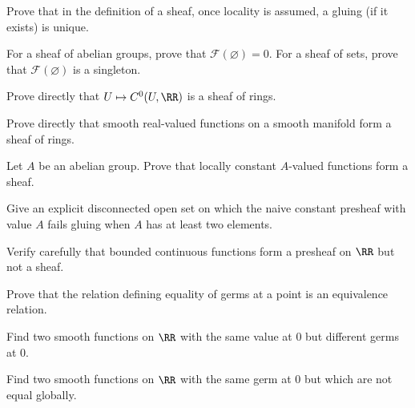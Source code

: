 \begin{exercise}
Prove that in the definition of a sheaf, once locality is assumed, a gluing (if it exists) is unique.
\end{exercise}

\begin{exercise}
For a sheaf of abelian groups, prove that $\mathcal F(\varnothing)=0$. For a sheaf of sets, prove that $\mathcal F(\varnothing)$ is a singleton.
\end{exercise}

\begin{exercise}
Prove directly that $U\mapsto C^0(U,\RR)$ is a sheaf of rings.
\end{exercise}

\begin{exercise}
Prove directly that smooth real-valued functions on a smooth manifold form a sheaf of rings.
\end{exercise}

\begin{exercise}
Let $A$ be an abelian group. Prove that locally constant $A$-valued functions form a sheaf.
\end{exercise}

\begin{exercise}
Give an explicit disconnected open set on which the naive constant presheaf with value $A$ fails gluing when $A$ has at least two elements.
\end{exercise}

\begin{exercise}
Verify carefully that bounded continuous functions form a presheaf on $\RR$ but not a sheaf.
\end{exercise}

\begin{exercise}
Prove that the relation defining equality of germs at a point is an equivalence relation.
\end{exercise}

\begin{exercise}
Find two smooth functions on $\RR$ with the same value at $0$ but different germs at $0$.
\end{exercise}

\begin{exercise}
Find two smooth functions on $\RR$ with the same germ at $0$ but which are not equal globally.
\end{exercise}

